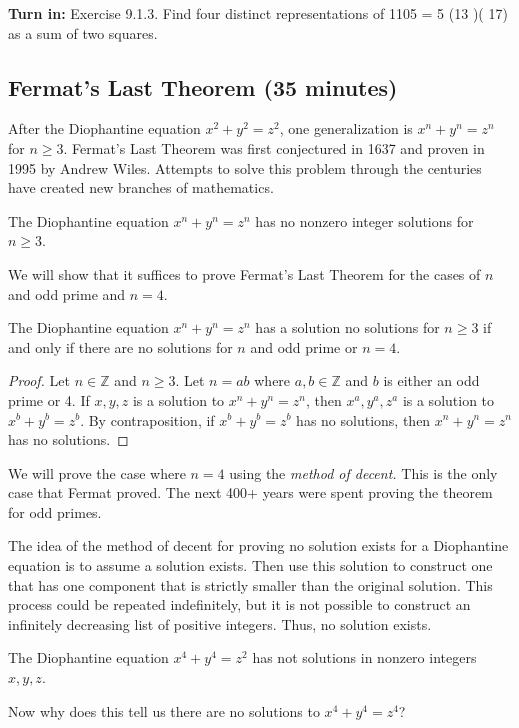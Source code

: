 \documentclass[letterpaper, 11 pt]{article}
\begin{document}
{\bf Turn in: }
Exercise 9.1.3. Find four distinct representations of 1105 = 5 (13 )( 17) as a sum of two squares.
\subsection{Fermat's Last Theorem (35 minutes)}
After the Diophantine equation $x^2+y^2=z^2$, one generalization is $x^n+y^n=z^n$ for $n\geq3$. Fermat's Last Theorem was first conjectured in 1637 and proven in 1995 by Andrew Wiles. Attempts to solve this problem through the centuries have created new branches of mathematics.

\begin{thm}
The Diophantine equation $x^n+y^n=z^n$ has no nonzero integer solutions for $n\geq3$.
\end{thm}

We will show that it suffices to prove Fermat's Last Theorem for the cases of $n$ and odd prime and $n=4$. 
\begin{thm}
 The Diophantine equation $x^n+y^n=z^n$ has a solution no solutions for $n\geq 3$ if and only if there are no solutions for $n$ and odd prime or $n=4$.
\end{thm}
\begin{proof}
 Let $n\in\mathbb{Z}$ and $n\geq 3$. Let $n=ab$ where $a,b\in\mathbb{Z}$ and $b$ is either an odd prime or 4. If $x,y,z$ is a solution to $x^n+y^n=z^n$, then $x^a,y^a,z^a$ is a solution to $x^b+y^b=z^b$. By contraposition, if $x^b+y^b=z^b$ has no solutions, then $x^n+y^n=z^n$ has no solutions.
\end{proof}

We will prove the case where $n=4$ using the \emph{method of decent.} This is the only case that Fermat proved. The next 400+ years were spent proving the theorem for odd primes. 

The idea of the method of decent for proving no solution exists for a Diophantine equation is to assume a solution exists. Then use this solution to construct one that has one component that is strictly smaller than the original solution. This process could be repeated indefinitely, but it is not possible to construct an infinitely decreasing list of positive integers. Thus, no solution exists.

\begin{thm}
 The Diophantine equation $x^4+y^4=z^2$ has not solutions in nonzero integers $x,y,z$.
\end{thm}
\begin{cb}
 Now why does this tell us there are no solutions to $x^4+y^4=z^4$?
\end{cb}
\end{document}
